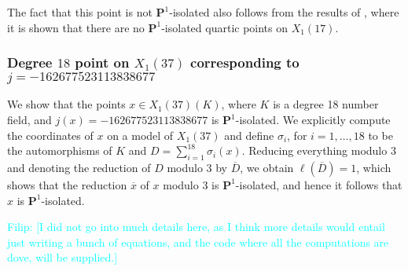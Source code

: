 \documentclass[11pt,reqno]{amsart}
\theoremstyle{plain}
\theoremstyle{definition}
\newcommand{\PP}{\mathbf P}
\newcommand{\filip}[1]{{\textcolor{cyan}{Filip: [#1]}}}
\newcommand{\abbey}[1]{\textcolor{blue}{Abbey: #1}}
\begin{document}
The fact that this point is not $\PP^1$-isolated also follows from the results of \cite[Proposition 6.7]{DerickxMazurKamienny}, where it is shown that there are no $\PP^1$-isolated quartic points on $X_1(17)$.


\subsubsection{Degree $18$ point on $X_1(37)$ corresponding to $j=-162677523113838677$}

We show that the points $x\in X_1(37)(K)$, where $K$ is a degree 18 number field, and $j(x)=-162677523113838677$ is $\PP^1$-isolated. We explicitly compute the coordinates of $x$ on a model of $X_1(37)$ and define  $\sigma_i$, for $i=1,\ldots, 18$ to be the automorphisms of $K$ and $D=\sum_{i=1}^{18}\sigma_i(x)$. Reducing everything modulo $3$ and denoting the reduction of $D$ modulo $3$ by $\overline{D}$, we obtain $\ell(\overline{D})=1$, which shows that the reduction 
$\overline{x}$ of $x$ modulo 3 is $\PP^1$-isolated, and hence it follows that $x$ is $\PP^1$-isolated.  %

\filip{I did not go into much details here, as I think more details would entail just writing a bunch of equations, and the code where all the computations are dove, will be supplied.}


\newpage
\end{document}
